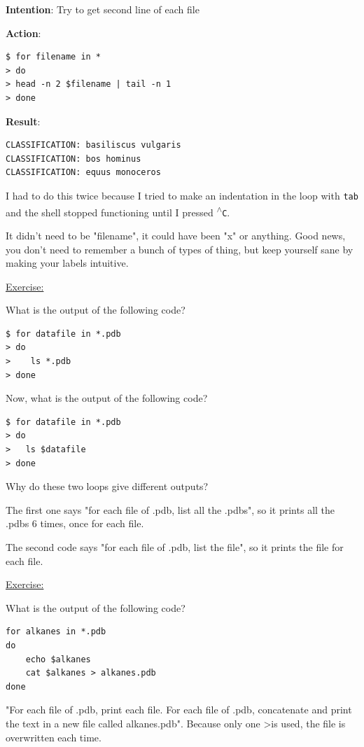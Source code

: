 \documentclass[12pt]{article}
\begin{document}
\textbf{Intention}: Try to get second line of each file

\textbf{Action}: \vspace{-1em}\begin{verbatim}
$ for filename in *
> do
> head -n 2 $filename | tail -n 1
> done
\end{verbatim}
\textbf{Result}: \vspace{-1em}\begin{verbatim}
CLASSIFICATION: basiliscus vulgaris
CLASSIFICATION: bos hominus
CLASSIFICATION: equus monoceros
\end{verbatim}

I had to do this twice because I tried to make an indentation in the loop with \texttt{tab} and the shell stopped functioning until I pressed \texttt{\textsuperscript{$\wedge$}C}.

It didn't need to be "filename", it could have been "x" or anything. Good news, you don't need to remember a bunch of types of thing, but keep yourself sane by making your labels intuitive.

\newpage\begin{addmargin}[1cm]{0cm}
\color{gray}
\vspace{1em}\underline{Exercise:}

What is the output of the following code?
\vspace{-1em}\begin{verbatim}
$ for datafile in *.pdb
> do
>    ls *.pdb
> done    
\end{verbatim}\vspace{-0.5em}
Now, what is the output of the following code?
\vspace{-1em}\begin{verbatim}
$ for datafile in *.pdb
> do
>	ls $datafile
> done
\end{verbatim}\vspace{-0.5em}
Why do these two loops give different outputs?

\color{black}
The first one says "for each file of .pdb, list all the .pdbs", so it prints all the .pdbs 6 times, once for each file.

The second code says "for each file of .pdb, list the file", so it prints the file for each file.
\end{addmargin}

\begin{addmargin}[1cm]{0cm}
\color{gray}
\vspace{1em}\underline{Exercise:}

What is the output of the following code?
\vspace{-1em}\begin{verbatim}
for alkanes in *.pdb
do
    echo $alkanes
    cat $alkanes > alkanes.pdb
done
\end{verbatim}\vspace{-0.5em}

\color{black}
"For each file of .pdb, print each file. For each file of .pdb, concatenate and print the text in a new file called alkanes.pdb". Because only one \textgreater  is used, the file is overwritten each time. 
\end{addmargin}
\end{document}
